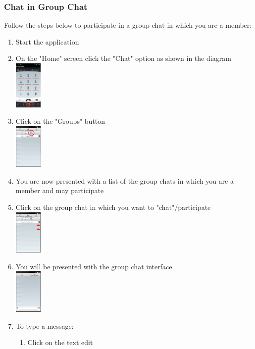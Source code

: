 \documentclass[11pt]{article}
\begin{document}
\subsubsection{Chat in Group Chat}  \label{chat}
Follow the steps below to participate in a group chat in which you are a member:
\begin{enumerate}
\item Start the application
\item On the "Home" screen click the "Chat" option as shown in the diagram\\
\includegraphics[width=50px]{images/mainScreen.png}
\item Click on the "Groups" button\\
\includegraphics[width=50px]{images/ChatlistNav.png}
\item You are now presented with a list of the group chats in which you are a member and may participate
\item Click on the group chat in which you want to "chat"/participate\\
\includegraphics[width=50px]{images/Grouplist.png}
\item You will be presented with the group chat interface\\
\includegraphics[width=50px]{images/groupchat.png}
\item To type a message:
\begin{enumerate}
\item Click on the text edit\\

\end{enumerate}
\end{enumerate}
\end{document}
